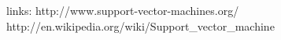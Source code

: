 links:
http://www.support-vector-machines.org/
http://en.wikipedia.org/wiki/Support_vector_machine

